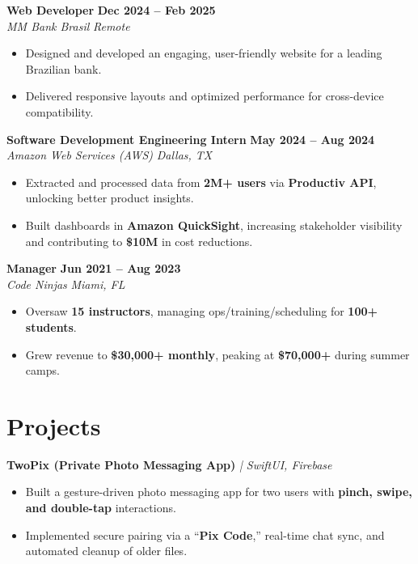 \documentclass[8pt]{resume}
\begin{document}
\textbf{Web Developer} \hfill \textbf{Dec 2024 – Feb 2025}\\
\textit{MM Bank Brasil} \hfill \textit{Remote}
\begin{itemize}
    \item Designed and developed an engaging, user-friendly website for a leading Brazilian bank.
    \item Delivered responsive layouts and optimized performance for cross-device compatibility.
\end{itemize}

\textbf{Software Development Engineering Intern} \hfill \textbf{May 2024 – Aug 2024}\\
\textit{Amazon Web Services (AWS)} \hfill \textit{Dallas, TX}
\begin{itemize}
    \item Extracted and processed data from \textbf{2M+ users} via \textbf{Productiv API}, unlocking better product insights.
    \item Built dashboards in \textbf{Amazon QuickSight}, increasing stakeholder visibility and contributing to \textbf{\$10M} in cost reductions.
\end{itemize}

\textbf{Manager} \hfill \textbf{Jun 2021 – Aug 2023}\\
\textit{Code Ninjas} \hfill \textit{Miami, FL}
\begin{itemize}
    \item Oversaw \textbf{15 instructors}, managing ops/training/scheduling for \textbf{100+ students}.
    \item Grew revenue to \textbf{\$30,000+ monthly}, peaking at \textbf{\$70,000+} during summer camps.
\end{itemize}

\section{Projects}

\textbf{TwoPix (Private Photo Messaging App)} \textit{| SwiftUI, Firebase}
\begin{itemize}
    \item Built a gesture-driven photo messaging app for two users with \textbf{pinch, swipe, and double-tap} interactions.
    \item Implemented secure pairing via a “\textbf{Pix Code},” real-time chat sync, and automated cleanup of older files.
\end{itemize}
\end{document}
